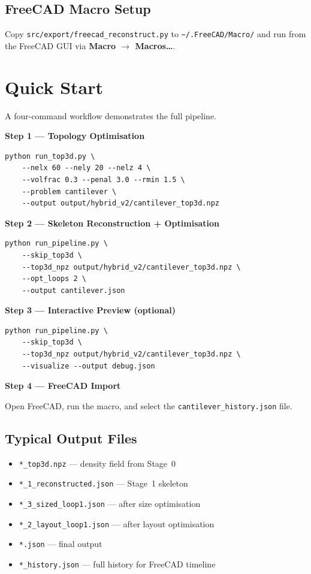 \documentclass[a4paper, 11pt, openany]{report}
\begin{document}
\subsection{FreeCAD Macro Setup}

Copy \texttt{src/export/freecad\_reconstruct.py} to
\texttt{\textasciitilde/.FreeCAD/Macro/} and run from the FreeCAD GUI via
\textbf{Macro $\to$ Macros\ldots}.


\section{Quick Start}
\label{sec:quickstart}

A four-command workflow demonstrates the full pipeline.

\textbf{Step 1 --- Topology Optimisation}

\begin{lstlisting}[style=bashstyle]
python run_top3d.py \
    --nelx 60 --nely 20 --nelz 4 \
    --volfrac 0.3 --penal 3.0 --rmin 1.5 \
    --problem cantilever \
    --output output/hybrid_v2/cantilever_top3d.npz
\end{lstlisting}

\textbf{Step 2 --- Skeleton Reconstruction + Optimisation}

\begin{lstlisting}[style=bashstyle]
python run_pipeline.py \
    --skip_top3d \
    --top3d_npz output/hybrid_v2/cantilever_top3d.npz \
    --opt_loops 2 \
    --output cantilever.json
\end{lstlisting}

\textbf{Step 3 --- Interactive Preview (optional)}

\begin{lstlisting}[style=bashstyle]
python run_pipeline.py \
    --skip_top3d \
    --top3d_npz output/hybrid_v2/cantilever_top3d.npz \
    --visualize --output debug.json
\end{lstlisting}

\textbf{Step 4 --- FreeCAD Import}

Open FreeCAD, run the macro, and select the
\texttt{cantilever\_history.json} file.

\subsection{Typical Output Files}

\begin{itemize}[nosep]
    \item \texttt{*\_top3d.npz} --- density field from Stage~0
    \item \texttt{*\_1\_reconstructed.json} --- Stage~1 skeleton
    \item \texttt{*\_3\_sized\_loop1.json} --- after size optimisation
    \item \texttt{*\_2\_layout\_loop1.json} --- after layout optimisation
    \item \texttt{*.json} --- final output
    \item \texttt{*\_history.json} --- full history for FreeCAD timeline
\end{itemize}
\end{document}
